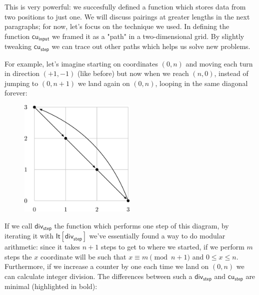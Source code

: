 \documentclass{book}
\theoremstyle{definition}
\theoremstyle{remark}
\theoremstyle{plain}
\newcommand{\rppIt}{\mathsf{It}}
\newcommand{\rppcui}{\mathsf{cu_{input}}}
\newcommand{\rppcustep}{\mathsf{cu_{step}}}
\newcommand{\rppdivstep}{\mathsf{div_{step}}}
\begin{document}
This is very powerful: we succesfully defined a function which stores data from two positions to just one.
We will discuss pairings at greater lengths in the next paragraphs; for now, let's focus on the technique we used.
In defining the function $\rppcui$ we framed it as a "path" in a two-dimensional grid.
By slightly tweaking $\rppcustep$ we can trace out other paths which helps us solve new problems.

For example, let's imagine starting on coordinates $(0,n)$ and moving each turn in direction $(+1,-1)$ (like before)
but now when we reach $(n,0)$, instead of jumping to $(0,n+1)$ we land again on $(0,n)$, looping in the same diagonal forever:

\begin{figure}[H]
  \centering
  \includegraphics[width=15em]{Immagini/div.png}
\end{figure}

If we call $\rppdivstep$ the function which performs one step of this diagram, by iterating it with $\rppIt[\rppdivstep]$
we've essentially found a way to do modular arithmetic: since it takes $n+1$ steps to get to where we started,
if we perform $m$ steps the $x$ coordinate will be such that $x \equiv m \pmod{n+1}$ and $0 \le x \le n$.
Furthermore, if we increase a counter by one each time we land on $(0,n)$ we can calculate integer division.
The differences between such a $\rppdivstep$ and $\rppcustep$ are minimal (highlighted in bold):
\end{document}
